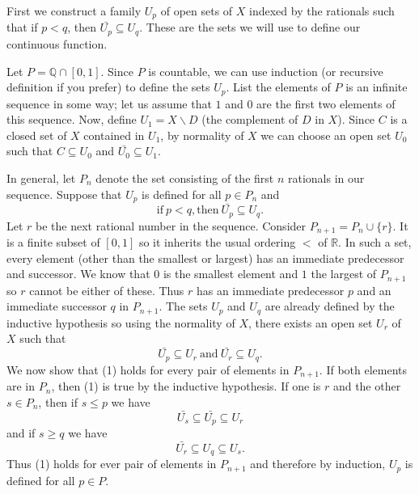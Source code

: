\documentclass[12pt]{article}
\begin{document}
First we construct a family $U_p$ of open sets of $X$ indexed by the
rationals such that if $ p < q$, then $\bar{U_p} \subseteq U_q$. These
are the sets we will use to define our continuous function.

Let $P = \mathbb{Q} \cap [0,1]$. Since $P$ is countable, we can use
induction (or recursive definition if you prefer) to define the sets
$U_p$. List the elements of $P$ is an infinite sequence in some way;
let us assume that $1$ and $0$ are the first two elements of this
sequence. Now, define $U_1 = X \backslash D$ (the complement of $D$ in
$X$). Since $C$ is a closed set of $X$ contained in $U_1$, by
normality of $X$ we can choose an open set $U_0$ such that $C
\subseteq U_0$ and $\bar{U_0} \subseteq U_1$.

In general, let $P_n$ denote the set consisting of the first $n$
rationals in our sequence. Suppose that $U_p$ is defined for all $p
\in P_n$ and
\begin{equation}
	\textrm{if} \ p < q, \textrm{then} \ \bar{U_p} \subseteq U_q.
\end{equation}
Let $r$ be the next rational number in the sequence. Consider $P_{n+1}
= P_n \cup \{r\}$.  It is a finite subset of $[0,1]$ so it inherits
the usual ordering $<$ of $\mathbb{R}$. In such a set, every element
(other than the smallest or largest) has an immediate predecessor and
successor. We know that $0$ is the smallest element and $1$ the
largest of $P_{n+1}$ so $r$ cannot be either of these.  Thus $r$ has
an immediate predecessor $p$ and an immediate successor $q$ in
$P_{n+1}$. The sets $U_p$ and $U_q$ are already defined by the
inductive hypothesis so using the normality of $X$, there exists an
open set $U_r$ of $X$ such that
\begin{displaymath}
	\bar{U_p} \subseteq U_r \ \textrm{and} \ \bar{U_r} \subseteq U_q.
\end{displaymath}We now show that (1) holds for every pair of elements in $P_{n+1}$. If
both elements are in $P_n$, then (1) is true by the inductive
hypothesis. If one is $r$ and the other $s \in P_n$, then if $s \le p$
we have
\begin{displaymath}
	\bar{U_s} \subseteq \bar{U_p} \subseteq U_r
\end{displaymath}
and if $s \ge q$ we have
\begin{displaymath}
	\bar{U_r} \subseteq U_q \subseteq U_s.
\end{displaymath}
Thus (1) holds for ever pair of elements in $P_{n+1}$ and therefore by
induction, $U_p$ is defined for all $p \in P$.
\end{document}
